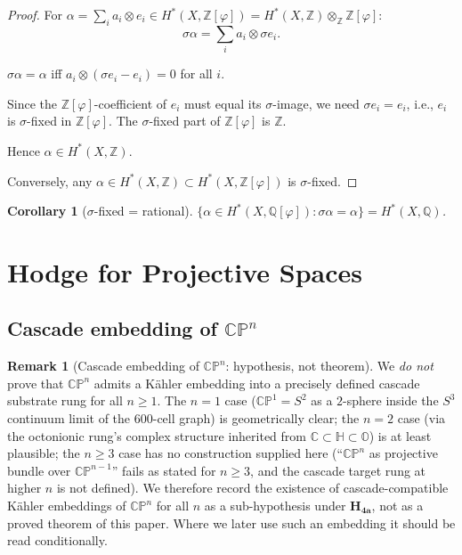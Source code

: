 \documentclass[11pt, a4paper]{amsart}
\newtheorem{corollary}[theorem]{Corollary}
\theoremstyle{definition}
\newtheorem{remark}[theorem]{Remark}
\newcommand{\Q}{\mathbb{Q}}
\newcommand{\Z}{\mathbb{Z}}
\newcommand{\CP}{\mathbb{CP}}
\newcommand{\pphi}{\varphi}
\begin{document}
\begin{proof}
For $\alpha = \sum_i a_i \otimes e_i \in H^*(X, \Z[\pphi]) = H^*(X, \Z) \otimes_\Z \Z[\pphi]$:
\[
\sigma\alpha = \sum_i a_i \otimes \sigma e_i.
\]

$\sigma\alpha = \alpha$ iff $a_i \otimes (\sigma e_i - e_i) = 0$ for all $i$.

Since the $\Z[\pphi]$-coefficient of $e_i$ must equal its $\sigma$-image,
we need $\sigma e_i = e_i$, i.e., $e_i$ is $\sigma$-fixed in $\Z[\pphi]$.
The $\sigma$-fixed part of $\Z[\pphi]$ is $\Z$.

Hence $\alpha \in H^*(X, \Z)$.

Conversely, any $\alpha \in H^*(X, \Z) \subset H^*(X, \Z[\pphi])$ is
$\sigma$-fixed.
\end{proof}

\begin{corollary}[$\sigma$-fixed = rational]\label{cor:fixrat}
$\{\alpha \in H^*(X, \Q[\pphi]) : \sigma\alpha = \alpha\} = H^*(X, \Q)$.
\end{corollary}

\section{Hodge for Projective Spaces}\label{sec:CPn}

\subsection{Cascade embedding of $\CP^n$}

\begin{remark}[Cascade embedding of $\CP^n$: hypothesis, not theorem]\label{thm:embedCPn}
We \emph{do not} prove that $\CP^n$ admits a Kähler embedding into
a precisely defined cascade substrate rung for all $n \geq 1$. The
$n=1$ case ($\CP^1 = S^2$ as a $2$-sphere inside the $S^3$
continuum limit of the 600-cell graph) is geometrically clear; the
$n=2$ case (via the octonionic rung's complex structure inherited
from $\mathbb{C} \subset \mathbb{H} \subset \mathbb{O}$) is at least
plausible; the $n\geq 3$ case has no construction supplied here
(``$\CP^n$ as projective bundle over $\CP^{n-1}$'' fails as stated
for $n \geq 3$, and the cascade target rung at higher $n$ is not
defined). We therefore record the existence of cascade-compatible
Kähler embeddings of $\CP^n$ for all $n$ as a sub-hypothesis under
$\mathbf{H_{4a}}$, not as a proved theorem of this paper. Where we
later use such an embedding it should be read conditionally.
\end{remark}
\end{document}
